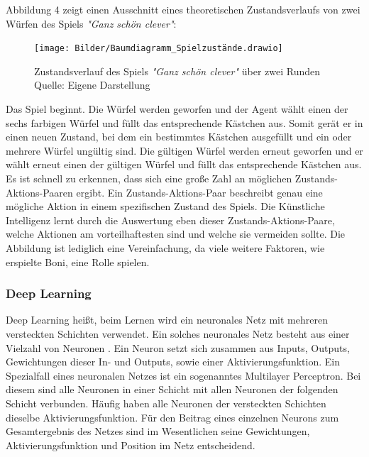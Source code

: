 Abbildung 4 zeigt einen Ausschnitt eines theoretischen Zustandsverlaufs von zwei Würfen des Spiels \textit{"Ganz schön clever"}:
\nopagebreak
\begin{figure}[H]
	\centering
	\texttt{[image: Bilder/Baumdiagramm\_Spielzustände.drawio]} 
	\caption[Zustandsverlauf des Spiels \textit{"Ganz schön clever"} über zwei Runden]{Zustandsverlauf des Spiels \textit{"Ganz schön clever"} über zwei Runden\\ Quelle: Eigene Darstellung}
\end{figure}	

Das Spiel beginnt. Die Würfel werden geworfen und der Agent wählt einen der sechs farbigen Würfel und füllt das entsprechende Kästchen aus. Somit gerät er in einen neuen Zustand, bei dem ein bestimmtes Kästchen ausgefüllt und ein oder mehrere Würfel ungültig sind. Die gültigen Würfel werden erneut geworfen und er wählt erneut einen der gültigen Würfel und füllt das entsprechende Kästchen aus. Es ist schnell zu erkennen, dass sich eine große Zahl an möglichen Zustands-Aktions-Paaren ergibt. Ein Zustands-Aktions-Paar beschreibt genau eine mögliche Aktion in einem spezifischen Zustand des Spiels. Die Künstliche Intelligenz lernt durch die Auswertung eben dieser Zustands-Aktions-Paare, welche Aktionen am vorteilhaftesten sind und welche sie vermeiden sollte. Die Abbildung ist lediglich eine Vereinfachung, da viele weitere Faktoren, wie erspielte Boni, eine Rolle spielen.

\newpage
\subsubsection{Deep Learning}
Deep Learning heißt, beim Lernen wird ein neuronales Netz mit mehreren versteckten Schichten verwendet. Ein solches neuronales Netz besteht aus einer Vielzahl von Neuronen \cite[S. 75]{sewak_deep_2019}. Ein Neuron setzt sich zusammen aus Inputs, Outputs, Gewichtungen dieser In- und Outputs, sowie einer Aktivierungsfunktion. Ein Spezialfall eines neuronalen Netzes ist ein sogenanntes Multilayer Perceptron. Bei diesem sind alle Neuronen in einer Schicht mit allen Neuronen der folgenden Schicht verbunden. Häufig haben alle Neuronen der versteckten Schichten dieselbe Aktivierungsfunktion. Für den Beitrag eines einzelnen Neurons zum Gesamtergebnis des Netzes sind im Wesentlichen seine Gewichtungen, Aktivierungsfunktion und Position im Netz entscheidend.\\

